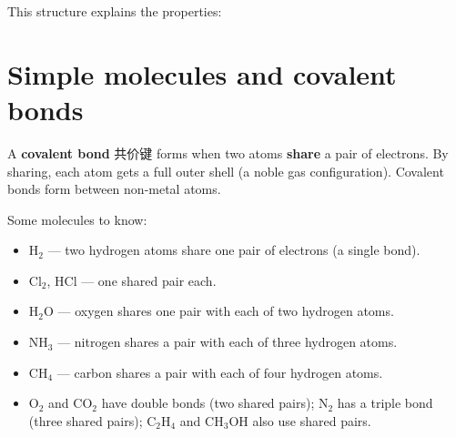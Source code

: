 \documentclass[11pt]{article}
\begin{document}
This structure explains the properties:

\begin{center}
\end{center}

\section*{Simple molecules and covalent bonds}

A \textbf{covalent bond} 共价键 forms when two atoms \textbf{share} a pair of electrons. By sharing, each atom gets a full outer shell (a noble gas configuration). Covalent bonds form between non-metal atoms.

Some molecules to know:

\begin{itemize}
\item $\text{H}_2$ — two hydrogen atoms share one pair of electrons (a single bond).

\item $\text{Cl}_2$, $\text{HCl}$ — one shared pair each.

\item $\text{H}_2\text{O}$ — oxygen shares one pair with each of two hydrogen atoms.

\item $\text{NH}_3$ — nitrogen shares a pair with each of three hydrogen atoms.

\item $\text{CH}_4$ — carbon shares a pair with each of four hydrogen atoms.

\item $\text{O}_2$ and $\text{CO}_2$ have double bonds (two shared pairs); $\text{N}_2$ has a triple bond (three shared pairs); $\text{C}_2\text{H}_4$ and $\text{CH}_3\text{OH}$ also use shared pairs.

\end{itemize}
\end{document}
